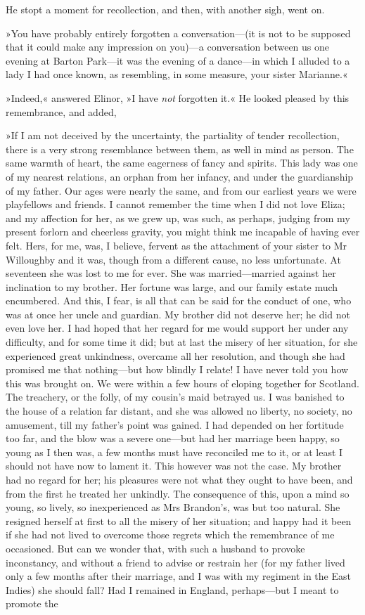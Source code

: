 He stopt a moment for recollection, and then, with another sigh, went on.

»You have probably entirely forgotten a conversation—(it is not to be supposed that it could make any impression on you)—a conversation between us one evening at Barton Park—it was the evening of a dance—in which I alluded to a lady I had once known, as resembling, in some measure, your sister Marianne.«

»Indeed,« answered Elinor, »I have \textit{not} forgotten it.« He looked pleased by this remembrance, and added,

»If I am not deceived by the uncertainty, the partiality of tender recollection, there is a very strong resemblance between them, as well in mind as person. The same warmth of heart, the same eagerness of fancy and spirits. This lady was one of my nearest relations, an orphan from her infancy, and under the guardianship of my father. Our ages were nearly the same, and from our earliest years we were playfellows and friends. I cannot remember the time when I did not love Eliza; and my affection for her, as we grew up, was such, as perhaps, judging from my present forlorn and cheerless gravity, you might think me incapable of having ever felt. Hers, for me, was, I believe, fervent as the attachment of your sister to Mr Willoughby and it was, though from a different cause, no less unfortunate. At seventeen she was lost to me for ever. She was married—married against her inclination to my brother. Her fortune was large, and our family estate much encumbered. And this, I fear, is all that can be said for the conduct of one, who was at once her uncle and guardian. My brother did not deserve her; he did not even love her. I had hoped that her regard for me would support her under any difficulty, and for some time it did; but at last the misery of her situation, for she experienced great unkindness, overcame all her resolution, and though she had promised me that nothing—but how blindly I relate! I have never told you how this was brought on. We were within a few hours of eloping together for Scotland. The treachery, or the folly, of my cousin’s maid betrayed us. I was banished to the house of a relation far distant, and she was allowed no liberty, no society, no amusement, till my father’s point was gained. I had depended on her fortitude too far, and the blow was a severe one—but had her marriage been happy, so young as I then was, a few months must have reconciled me to it, or at least I should not have now to lament it. This however was not the case. My brother had no regard for her; his pleasures were not what they ought to have been, and from the first he treated her unkindly. The consequence of this, upon a mind so young, so lively, so inexperienced as Mrs Brandon’s, was but too natural. She resigned herself at first to all the misery of her situation; and happy had it been if she had not lived to overcome those regrets which the remembrance of me occasioned. But can we wonder that, with such a husband to provoke inconstancy, and without a friend to advise or restrain her (for my father lived only a few months after their marriage, and I was with my regiment in the East Indies) she should fall? Had I remained in England, perhaps—but I meant to promote the 